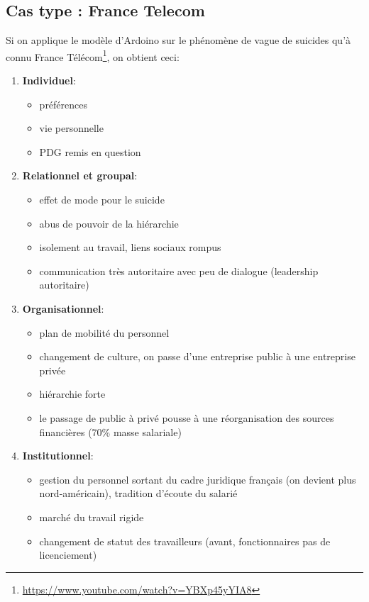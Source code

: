 \documentclass[12pt]{article}
\begin{document}
  \subsection{Cas type : France Telecom}
  
  Si on applique le modèle d'Ardoino sur le phénomène de vague de suicides qu'à connu France Télécom\footnote{\url{https://www.youtube.com/watch?v=YBXp45yYIA8}}, on obtient ceci:
  \begin{enumerate}
  \item \textbf{Individuel}:    \begin{itemize}
  								\item préférences
  								\item vie personnelle
  								\item PDG remis en question
  								\end{itemize}
  \item \textbf{Relationnel et groupal}:    \begin{itemize}
  											\item effet de mode pour le suicide
  											\item abus de pouvoir de la hiérarchie
  											\item isolement au travail, liens sociaux rompus
  											\item communication très autoritaire avec peu de dialogue (leadership autoritaire)
  											\end{itemize}
  \item \textbf{Organisationnel}:   \begin{itemize}
  									\item plan de mobilité du personnel
  									\item changement de culture, on passe d'une entreprise public à une entreprise privée
  									\item hiérarchie forte
  									\item le passage de public à privé pousse à une réorganisation des sources financières (70\% masse salariale)
  									\end{itemize}
  \item \textbf{Institutionnel}:  	\begin{itemize}
  									\item gestion du personnel sortant du cadre juridique français (on devient plus nord-américain), tradition d'écoute du salarié
  									\item marché du travail rigide
  									\item changement de statut des travailleurs (avant, fonctionnaires pas de licenciement)
  									\end{itemize}
\end{enumerate}   
\end{document}
